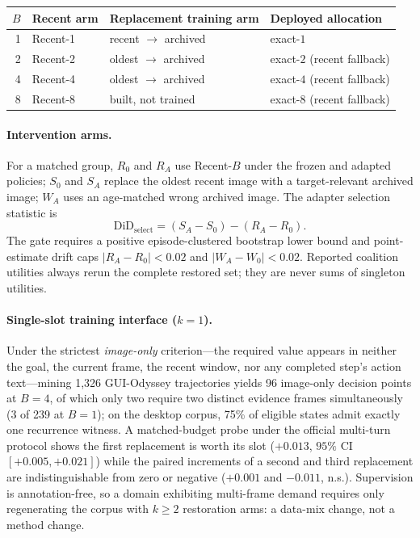 \documentclass[letterpaper]{article} %
\begin{document}
\begin{center}
\centering
{\small
\setlength{\tabcolsep}{3.8pt}
\begin{tabular}{@{}rlll@{}}
\toprule
$B$ & Recent arm & Replacement training arm & Deployed allocation \\
\midrule
1 & Recent-1 & recent $\to$ archived & exact-$1$ \\
2 & Recent-2 & oldest $\to$ archived & exact-$2$ (recent fallback) \\
4 & Recent-4 & oldest $\to$ archived & exact-$4$ (recent fallback) \\
8 & Recent-8 & built, not trained & exact-$8$ (recent fallback) \\
\bottomrule
\end{tabular}
}
\label{tab:s-design}
\end{center}

\paragraph{Intervention arms.}
For a matched group, $R_0$ and $R_A$ use Recent-$B$ under the frozen and
adapted policies; $S_0$ and $S_A$ replace the oldest recent image with a
target-relevant archived image; $W_A$ uses an age-matched wrong archived
image. The adapter selection statistic is
\[
  \mathrm{DiD}_{\mathrm{select}}
  =(S_A-S_0)-(R_A-R_0).
\]
The gate requires a positive episode-clustered bootstrap lower bound and
point-estimate drift caps
$\lvert R_A-R_0\rvert<0.02$ and
$\lvert W_A-W_0\rvert<0.02$. Reported coalition utilities always rerun the
complete restored set; they are never sums of singleton utilities.

\paragraph{Single-slot training interface ($k{=}1$).}
Under the strictest \emph{image-only} criterion---the required value
appears in neither the goal, the current frame, the recent window, nor any
completed step's action text---mining 1{,}326 GUI-Odyssey trajectories
yields 96 image-only decision points at $B{=}4$, of which only two require
two distinct evidence frames simultaneously (3 of 239 at $B{=}1$); on the
desktop corpus, 75\% of eligible states admit exactly one recurrence
witness. A matched-budget probe under the official multi-turn protocol
shows the first replacement is worth its slot ($+0.013$, $95\%$ CI
$[+0.005,+0.021]$) while the paired increments of a second and third
replacement are indistinguishable from zero or negative ($+0.001$ and
$-0.011$, n.s.). Supervision is annotation-free, so a domain exhibiting
multi-frame demand requires only regenerating the corpus with $k{\geq}2$
restoration arms: a data-mix change, not a method change.
\end{document}
